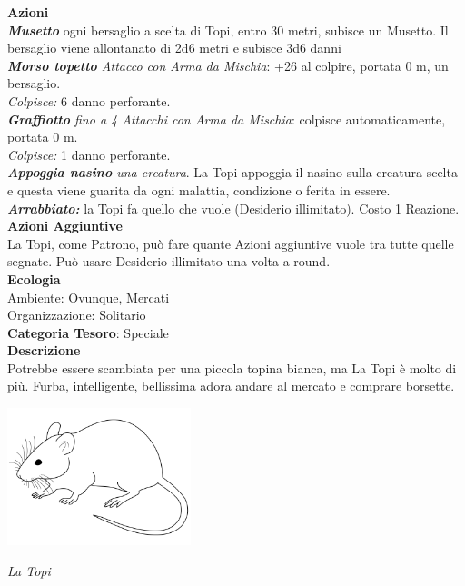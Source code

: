 \begin{multicols}{2}
{\textbf{Azioni}\\
\emph{\textbf{Musetto}} ogni bersaglio a scelta di Topi, entro 30 metri, subisce un Musetto. Il bersaglio viene allontanato di 2d6 metri e subisce 3d6 danni\\
\emph{\textbf{Morso topetto} Attacco con Arma da Mischia}: +26 al colpire, portata 0 m, un bersaglio.\\
\emph{Colpisce:} 6 danno perforante.\\
\emph{\textbf{Graffiotto} fino a 4 Attacchi con Arma da Mischia}: colpisce  automaticamente, portata 0 m.\\
\emph{Colpisce:} 1 danno perforante.\\
\emph{\textbf{Appoggia nasino} una creatura}. La Topi appoggia il nasino sulla creatura scelta e questa viene guarita da ogni malattia, condizione o ferita in essere.\\
\emph{\textbf{Arrabbiato:}} la Topi fa quello che vuole (Desiderio illimitato). Costo 1 Reazione.\\
\textbf{Azioni Aggiuntive}\\
La Topi, come Patrono, può fare quante Azioni aggiuntive vuole tra tutte quelle segnate. Può usare Desiderio illimitato una volta a round.\\
\textbf{Ecologia}\\
Ambiente: Ovunque, Mercati\\
Organizzazione: Solitario\\
\textbf{Categoria Tesoro}: Speciale\\
\textbf{Descrizione}\\
Potrebbe essere scambiata per una piccola topina bianca, ma La Topi è molto di più. Furba, intelligente, bellissima adora andare al mercato e comprare borsette.

\medskip

\begin{center}
	\includegraphics[width=0.4\textwidth]{immagini/mice.png}

	\centering
	\emph{La Topi}
\end{center}

}
\end{multicols}
